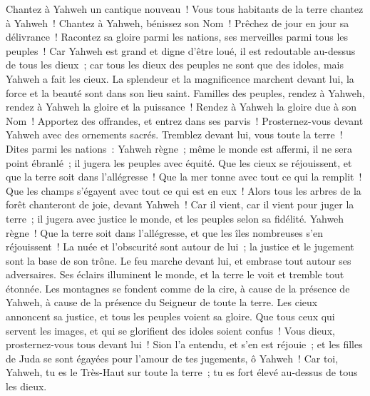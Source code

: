 \begin{multicols}{2}
\VerseOne{}Chantez à Yahweh un cantique nouveau~! Vous tous habitants de la terre chantez à Yahweh~!
Chantez à Yahweh, bénissez son Nom~! Prêchez de jour en jour sa délivrance~!
Racontez sa gloire parmi les nations, ses merveilles parmi tous les peuples~!
Car Yahweh est grand et digne d'être loué, il est redoutable au-dessus de tous les dieux~;
car tous les dieux des peuples ne sont que des idoles, mais Yahweh a fait les cieux.
La splendeur et la magnificence marchent devant lui, la force et la beauté sont dans son lieu saint.
Familles des peuples, rendez à Yahweh, rendez à Yahweh la gloire et la puissance~!
Rendez à Yahweh la gloire due à son Nom~! Apportez des offrandes, et entrez dans ses parvis~!
Prosternez-vous devant Yahweh avec des ornements sacrés. Tremblez devant lui, vous toute la terre~!
Dites parmi les nations~: Yahweh règne~; même le monde est affermi, il ne sera point ébranlé~; il jugera les peuples avec équité.
Que les cieux se réjouissent, et que la terre soit dans l'allégresse~! Que la mer tonne avec tout ce qui la remplit~!
Que les champs s'égayent avec tout ce qui est en eux~! Alors tous les arbres de la forêt chanteront de joie,
devant Yahweh~! Car il vient, car il vient pour juger la terre~; il jugera avec justice le monde, et les peuples selon sa fidélité.
\VerseOne{}Yahweh règne~! Que la terre soit dans l'allégresse, et que les îles nombreuses s'en réjouissent~!
La nuée et l'obscurité sont autour de lui~; la justice et le jugement sont la base de son trône.
Le feu marche devant lui, et embrase tout autour ses adversaires.
Ses éclairs illuminent le monde, et la terre le voit et tremble tout étonnée.
Les montagnes se fondent comme de la cire, à cause de la présence de Yahweh, à cause de la présence du Seigneur de toute la terre.
Les cieux annoncent sa justice, et tous les peuples voient sa gloire.
Que tous ceux qui servent les images, et qui se glorifient des idoles soient confus~! Vous dieux, prosternez-vous tous devant lui~!
Sion l'a entendu, et s'en est réjouie~; et les filles de Juda se sont égayées pour l'amour de tes jugements, ô Yahweh~!
Car toi, Yahweh, tu es le Très-Haut sur toute la terre~; tu es fort élevé au-dessus de tous les dieux.

\end{multicols}

